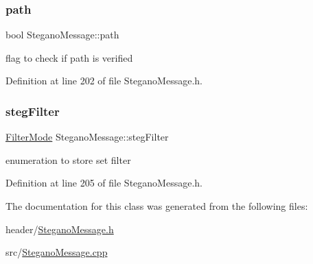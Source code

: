 \mbox{\label{classSteganoMessage_a399f4c181d3b7b15ccdb5c925a7a1f51}} 
\subsubsection{\texorpdfstring{path}{path}}
{\footnotesize\ttfamily bool Stegano\+Message\+::path\hspace{0.3cm}{\ttfamily [private]}}

flag to check if path is verified 

Definition at line 202 of file Stegano\+Message.\+h.

\mbox{\label{classSteganoMessage_af20fb772ae34deaccd23144b38f06320}} 
\subsubsection{\texorpdfstring{stegFilter}{stegFilter}}
{\footnotesize\ttfamily \mbox{\hyperlink{constants_8h_a36bd51b89b9e0e6e4dbbe565b9155083}{Filter\+Mode}} Stegano\+Message\+::steg\+Filter\hspace{0.3cm}{\ttfamily [private]}}

enumeration to store set filter 

Definition at line 205 of file Stegano\+Message.\+h.



The documentation for this class was generated from the following files\+:\begin{DoxyCompactItemize}
\item 
header/\mbox{\hyperlink{SteganoMessage_8h}{Stegano\+Message.\+h}}\item 
src/\mbox{\hyperlink{SteganoMessage_8cpp}{Stegano\+Message.\+cpp}}\end{DoxyCompactItemize}
